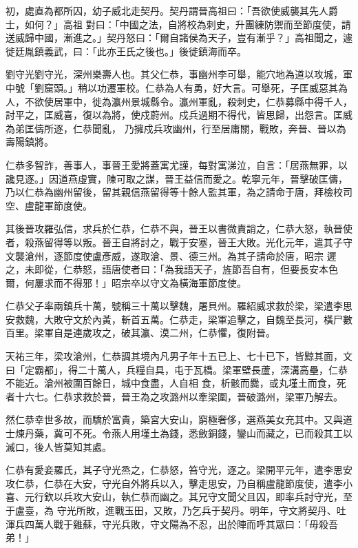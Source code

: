 \begin{pinyinscope}
 初，處直為都所囚，幼子威北走契丹。契丹謂晉高祖曰：「吾欲使威襲其先人爵士，如何？」高祖
 對曰：「中國之法，自將校為刺史，升團練防禦而至節度使，請送威歸中國，漸進之。」契丹怒曰：「爾自諸侯為天子，豈有漸乎？」高祖聞之，遽徙廷胤鎮義武，曰：「此亦王氏之後也。」後徙鎮海而卒。



 劉守光劉守光，深州樂壽人也。其父仁恭，事幽州李可舉，能穴地為道以攻城，軍中號「劉窟頭。」稍以功遷軍校。仁恭為人有勇，好大言。可舉死，子匡威惡其為人，不欲使居軍中，徙為瀛州景城縣令。瀛州軍亂，殺刺史，仁恭募縣中得千人，討平之，匡威喜，復以為將，使戍蔚州。戍兵過期不得代，皆思歸，出怨言。匡威為弟匡儔所逐，仁恭聞亂，
 乃擁戍兵攻幽州，行至居庸關，戰敗，奔晉、晉以為壽陽鎮將。



 仁恭多智詐，善事人，事晉王愛將蓋寓尤謹，每對寓涕泣，自言：「居燕無罪，以讒見逐。」因道燕虛實，陳可取之謀，晉王益信而愛之。乾寧元年，晉擊破匡儔，乃以仁恭為幽州留後，留其親信燕留得等十餘人監其軍，為之請命于唐，拜檢校司空、盧龍軍節度使。



 其後晉攻羅弘信，求兵於仁恭，仁恭不與，晉王以書微責誚之，仁恭大怒，執晉使者，殺燕留得等以叛。晉王自將討之，戰于安塞，晉王大敗。光化元年，遣其子守文襲滄州，逐節度使盧彥威，遂取滄、景、德三州。為其子請命於唐，昭宗
 遲之，未即從，仁恭怒，語唐使者曰：「為我語天子，旌節吾自有，但要長安本色爾，何屢求而不得邪！」昭宗卒以守文為橫海軍節度使。



 仁恭父子率兩鎮兵十萬，號稱三十萬以擊魏，屠貝州。羅紹威求救於梁，梁遣李思安救魏，大敗守文於內黃，斬首五萬。仁恭走，梁軍追擊之，自魏至長河，橫尸數百里。梁軍自是連歲攻之，破其瀛、漠二州，仁恭懼，復附晉。



 天祐三年，梁攻滄州，仁恭調其境內凡男子年十五已上、七十已下，皆黥其面，文曰「定霸都」，得二十萬人，兵糧自具，屯于瓦橋。梁軍壁長蘆，深溝高壘，仁恭不能近。滄州被圍百餘日，城中食盡，人自相
 食，析骸而爨，或丸墐土而食，死者十六七。仁恭求救於晉，晉王為之攻潞州以牽梁圍，晉破潞州，梁軍乃解去。



 然仁恭幸世多故，而驕於富貴，築宮大安山，窮極奢侈，選燕美女充其中。又與道士煉丹藥，冀可不死。令燕人用墐土為錢，悉斂銅錢，鑾山而藏之，已而殺其工以滅口，後人皆莫知其處。



 仁恭有愛妾羅氏，其子守光烝之，仁恭怒，笞守光，逐之。梁開平元年，遣李思安攻仁恭，仁恭在大安，守光自外將兵以入，擊走思安，乃自稱盧龍節度使，遣李小喜、元行欽以兵攻大安山，執仁恭而幽之。其兄守文聞父且囚，即率兵討守光，至于盧臺，為
 守光所敗，進戰玉田，又敗，乃乞兵于契丹。明年，守文將契丹、吐渾兵四萬人戰于雞蘇，守光兵敗，守文陽為不忍，出於陣而呼其眾曰：「毋殺吾弟！」




\end{pinyinscope}
